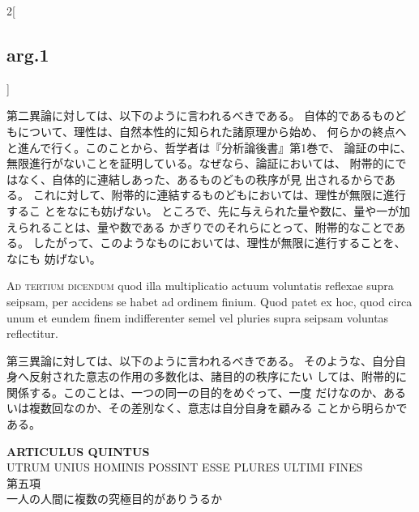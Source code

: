\documentclass[paper=a4paper,fontsize=10pt,jafontsize=9pt,titlepage]{jlreq}
\begin{document}
\begin{paracol}{2}[\subsection{arg.1}]
\switchcolumn

第二異論に対しては、以下のように言われるべきである。
自体的であるものどもについて、理性は、自然本性的に知られた諸原理から始め、
 何らかの終点へと進んで行く。このことから、哲学者は『分析論後書』第1巻で、
 論証の中に、無限進行がないことを証明している。なぜなら、論証においては、
 附帯的にではなく、自体的に連結しあった、あるものどもの秩序が見
 出されるからである。
これに対して、附帯的に連結するものどもにおいては、理性が無限に進行するこ
 とをなにも妨げない。
ところで、先に与えられた量や数に、量や一が加えられることは、量や数である
 かぎりでのそれらにとって、附帯的なことである。
したがって、このようなものにおいては、理性が無限に進行することを、なにも
 妨げない。

\switchcolumn*[\subsection{ad.3}]

{\scshape Ad tertium dicendum} quod illa
multiplicatio actuum voluntatis reflexae supra seipsam, per accidens se
habet ad ordinem finium. Quod patet ex hoc, quod circa unum et eundem
finem indifferenter semel vel pluries supra seipsam voluntas
reflectitur.

\switchcolumn

第三異論に対しては、以下のように言われるべきである。
そのような、自分自身へ反射された意志の作用の多数化は、諸目的の秩序にたい
 しては、附帯的に関係する。このことは、一つの同一の目的をめぐって、一度
 だけなのか、あるいは複数回なのか、その差別なく、意志は自分自身を顧みる
ことから明らかである。

\end{paracol}
\newpage


{}
\setcounter{section}{5}
\setcounter{subsection}{0}
\begin{center}
 {\Large {\bfseries ARTICULUS QUINTUS}}\\
 {\large UTRUM UNIUS HOMINIS POSSINT ESSE PLURES ULTIMI FINES}\\
 {\Large 第五項\\一人の人間に複数の究極目的がありうるか}
\end{center}
\end{document}
